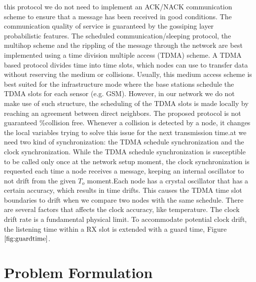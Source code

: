 \documentclass[a4paper,8pt]{report}
\begin{document}
this protocol we do not need to implement an ACK/NACK communication
scheme to ensure that a message has been received in good
conditions. The communication quality of service is guaranteed by
the gossiping layer probabilistic features. The scheduled
communication/sleeping protocol, the multihop scheme and the
rippling of the message through the network are best implemented
using a time division multiple access (TDMA) scheme. A TDMA based
protocol divides time into time slots, which nodes can use to
transfer data without reserving the medium or collisions. Usually,
this medium access scheme is best suited for the infrastructure mode
where the base stations schedule the TDMA slots for each sensor
(e.g. GSM). However, in our network we do not make use of such
structure, the scheduling of the TDMA slots is made locally by
reaching an agreement between direct neighbors. The proposed
protocol is not guaranteed $\%$collision free. Whenever a collision
is detected by a node, it changes the local variables trying to
solve this issue for the next transmission time.at we need two kind
of synchronization: the TDMA schedule synchronization and the clock
synchronization. While the TDMA schedule synchronization is
susceptible to be called only once at the network setup moment, the
clock synchronization is requested each time a node receives a
message, keeping an internal oscillator to not drift from the given
$T_o$ moment.Each node has a crystal oscillator that has a certain
accuracy, which results in time drifts. This causes the TDMA time
slot boundaries to drift when we compare two nodes with the same
schedule. There are several factors that affects the clock accuracy,
like temperature. The clock drift rate is a fundamental physical
limit. To accommodate potential clock drift, the listening time
within a RX slot is extended with a guard time, Figure
$\ref{fig:guardtime}$.
\chapter{Problem Formulation}
\end{document}
